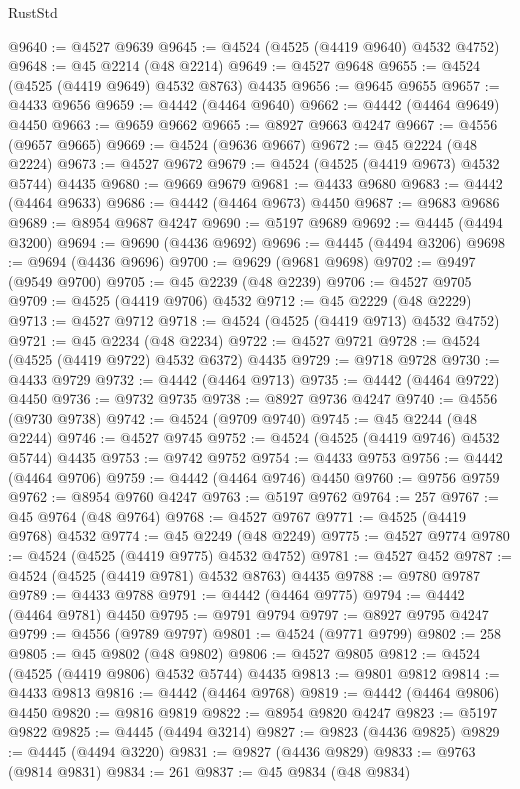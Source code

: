 \begin{lexlean}{RustStd}
\begin{coremodule}
@9640 := @4527 @9639
@9645 := @4524 (@4525 (@4419 @9640) @4532 @4752)
@9648 := @45 @2214 (@48 @2214)
@9649 := @4527 @9648
@9655 := @4524 (@4525 (@4419 @9649) @4532 @8763) @4435
@9656 := @9645 @9655
@9657 := @4433 @9656
@9659 := @4442 (@4464 @9640)
@9662 := @4442 (@4464 @9649) @4450
@9663 := @9659 @9662
@9665 := @8927 @9663 @4247
@9667 := @4556 (@9657 @9665)
@9669 := @4524 (@9636 @9667)
@9672 := @45 @2224 (@48 @2224)
@9673 := @4527 @9672
@9679 := @4524 (@4525 (@4419 @9673) @4532 @5744) @4435
@9680 := @9669 @9679
@9681 := @4433 @9680
@9683 := @4442 (@4464 @9633)
@9686 := @4442 (@4464 @9673) @4450
@9687 := @9683 @9686
@9689 := @8954 @9687 @4247
@9690 := @5197 @9689
@9692 := @4445 (@4494 @3200)
@9694 := @9690 (@4436 @9692)
@9696 := @4445 (@4494 @3206)
@9698 := @9694 (@4436 @9696)
@9700 := @9629 (@9681 @9698)
@9702 := @9497 (@9549 @9700)
@9705 := @45 @2239 (@48 @2239)
@9706 := @4527 @9705
@9709 := @4525 (@4419 @9706) @4532
@9712 := @45 @2229 (@48 @2229)
@9713 := @4527 @9712
@9718 := @4524 (@4525 (@4419 @9713) @4532 @4752)
@9721 := @45 @2234 (@48 @2234)
@9722 := @4527 @9721
@9728 := @4524 (@4525 (@4419 @9722) @4532 @6372) @4435
@9729 := @9718 @9728
@9730 := @4433 @9729
@9732 := @4442 (@4464 @9713)
@9735 := @4442 (@4464 @9722) @4450
@9736 := @9732 @9735
@9738 := @8927 @9736 @4247
@9740 := @4556 (@9730 @9738)
@9742 := @4524 (@9709 @9740)
@9745 := @45 @2244 (@48 @2244)
@9746 := @4527 @9745
@9752 := @4524 (@4525 (@4419 @9746) @4532 @5744) @4435
@9753 := @9742 @9752
@9754 := @4433 @9753
@9756 := @4442 (@4464 @9706)
@9759 := @4442 (@4464 @9746) @4450
@9760 := @9756 @9759
@9762 := @8954 @9760 @4247
@9763 := @5197 @9762
@9764 := 257
@9767 := @45 @9764 (@48 @9764)
@9768 := @4527 @9767
@9771 := @4525 (@4419 @9768) @4532
@9774 := @45 @2249 (@48 @2249)
@9775 := @4527 @9774
@9780 := @4524 (@4525 (@4419 @9775) @4532 @4752)
@9781 := @4527 @452
@9787 := @4524 (@4525 (@4419 @9781) @4532 @8763) @4435
@9788 := @9780 @9787
@9789 := @4433 @9788
@9791 := @4442 (@4464 @9775)
@9794 := @4442 (@4464 @9781) @4450
@9795 := @9791 @9794
@9797 := @8927 @9795 @4247
@9799 := @4556 (@9789 @9797)
@9801 := @4524 (@9771 @9799)
@9802 := 258
@9805 := @45 @9802 (@48 @9802)
@9806 := @4527 @9805
@9812 := @4524 (@4525 (@4419 @9806) @4532 @5744) @4435
@9813 := @9801 @9812
@9814 := @4433 @9813
@9816 := @4442 (@4464 @9768)
@9819 := @4442 (@4464 @9806) @4450
@9820 := @9816 @9819
@9822 := @8954 @9820 @4247
@9823 := @5197 @9822
@9825 := @4445 (@4494 @3214)
@9827 := @9823 (@4436 @9825)
@9829 := @4445 (@4494 @3220)
@9831 := @9827 (@4436 @9829)
@9833 := @9763 (@9814 @9831)
@9834 := 261
@9837 := @45 @9834 (@48 @9834)

\end{coremodule}
\end{lexlean}
